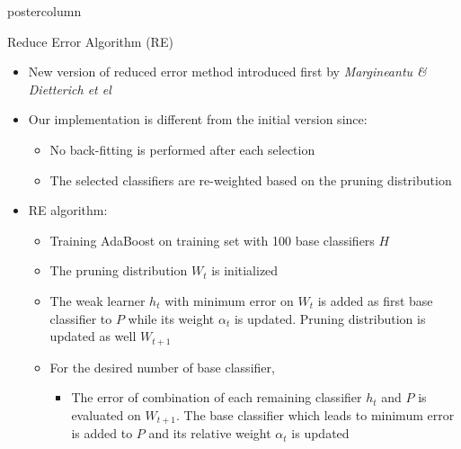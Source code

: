 \documentclass[final]{beamer}
\begin{document}
\begin{frame}
\begin{columns}
\begin{column}{.49\textwidth}
\begin{beamercolorbox}[center,wd=\textwidth]{postercolumn}
\begin{minipage}[T]{.95\textwidth}
{%
          \vfill
          \begin{block}{Reduce Error Algorithm (RE)}
              \begin{itemize}
              	\item New version of reduced error method introduced first by \textit{Margineantu \& Dietterich et el} 
              	\item Our implementation is different from the initial version since: 
              	\begin{itemize}
              		\item No back-fitting is performed after each selection
              		\item The selected classifiers are re-weighted based on the pruning distribution 
              	\end{itemize}
              \item RE algorithm:              
              	\begin{itemize}
              	\item Training AdaBoost on training set with 100 base classifiers $H$ 
              	\item The pruning distribution $W_{t}$ is initialized
              	\item The weak learner $h_{t}$ with minimum error on $W_{t}$ is added as first base classifier to $P$ while its weight $\alpha_{t}$ is updated.  Pruning distribution is updated as well $W_{t+1}$
             	\item For the desired number of base classifier, 
             	\begin{itemize}
              		\item The error of combination of each remaining classifier $h_{t}$ and $P$ is evaluated on $W_{t+1}$. The base classifier which leads to minimum error is added to $P$ and its relative weight $\alpha_{t}$ is updated

\end{itemize}
\end{itemize}
\end{itemize}
\end{block}}
\end{minipage}
\end{beamercolorbox}
\end{column}
\end{columns}
\end{frame}
\end{document}
